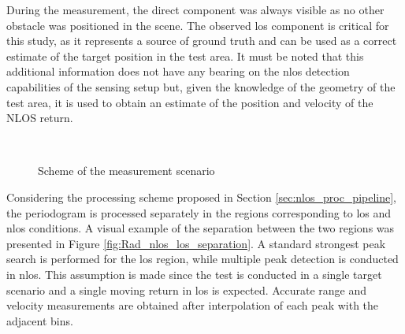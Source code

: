 During the measurement, the direct component was always visible as no other obstacle was positioned in the scene. 
The observed \gls{los} component is critical for this study, as it represents a source of ground truth and can be used as a correct estimate of the target position in the test area.
It must be noted that this additional information does not have any bearing on the \gls{nlos} detection capabilities of the sensing setup but, given 
the knowledge of the geometry of the test area, it is used to obtain an estimate of the position and velocity of the NLOS return. 

\begin{figure}[t]
	\centering
	
	\\
	\caption{\small Scheme of the measurement scenario}
	\label{fig:Test1_base_and_top_view}
\end{figure}

Considering the processing scheme proposed in Section \ref{sec:nlos_proc_pipeline}, the periodogram is processed separately in the regions corresponding to \gls{los} and \gls{nlos} conditions. A visual example of the separation between the two regions was presented in Figure \ref{fig:Rad_nlos_los_separation}.
A standard strongest peak search is performed for the \gls{los} region, while multiple peak detection is conducted in \gls{nlos}. This assumption is made since the test is conducted in a single target scenario and a single moving return in \gls{los} is expected.
Accurate range and velocity measurements are obtained after interpolation of each peak with the adjacent bins.

